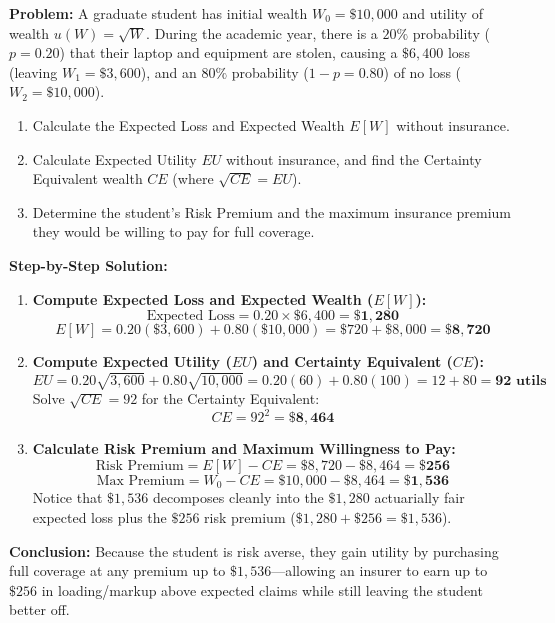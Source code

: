 \documentclass[11pt,letterpaper]{article}
\begin{document}
\begin{tcolorbox}[colback=CourseBlue!5!white,colframe=CourseBlue!80!black,title=\textbf{Work It Out: Expected Utility, Certainty Equivalent, and Maximum Premium}]
\textbf{Problem:} A graduate student has initial wealth $W_0 = \$10{,}000$ and utility of wealth $u(W) = \sqrt{W}$. During the academic year, there is a $20\%$ probability ($p = 0.20$) that their laptop and equipment are stolen, causing a $\$6{,}400$ loss (leaving $W_1 = \$3{,}600$), and an $80\%$ probability ($1 - p = 0.80$) of no loss ($W_2 = \$10{,}000$).
\begin{enumerate}
    \item Calculate the Expected Loss and Expected Wealth $E[W]$ without insurance.
    \item Calculate Expected Utility $EU$ without insurance, and find the Certainty Equivalent wealth $CE$ (where $\sqrt{CE} = EU$).
    \item Determine the student's Risk Premium and the maximum insurance premium they would be willing to pay for full coverage.
\end{enumerate}

\medskip
\noindent\textbf{Step-by-Step Solution:}
\begin{enumerate}
    \item \textbf{Compute Expected Loss and Expected Wealth ($E[W]$):}
    \[
    \text{Expected Loss} = 0.20 \times \$6{,}400 = \mathbf{\$1{,}280}
    \]
    \[
    E[W] = 0.20(\$3{,}600) + 0.80(\$10{,}000) = \$720 + \$8{,}000 = \mathbf{\$8{,}720}
    \]

    \item \textbf{Compute Expected Utility ($EU$) and Certainty Equivalent ($CE$):}
    \[
    EU = 0.20\sqrt{3{,}600} + 0.80\sqrt{10{,}000} = 0.20(60) + 0.80(100) = 12 + 80 = \mathbf{92\text{ utils}}
    \]
    Solve $\sqrt{CE} = 92$ for the Certainty Equivalent:
    \[
    CE = 92^2 = \mathbf{\$8{,}464}
    \]

    \item \textbf{Calculate Risk Premium and Maximum Willingness to Pay:}
    \[
    \text{Risk Premium} = E[W] - CE = \$8{,}720 - \$8{,}464 = \mathbf{\$256}
    \]
    \[
    \text{Max Premium} = W_0 - CE = \$10{,}000 - \$8{,}464 = \mathbf{\$1{,}536}
    \]
    Notice that $\$1{,}536$ decomposes cleanly into the $\$1{,}280$ actuarially fair expected loss plus the $\$256$ risk premium ($\$1{,}280 + \$256 = \$1{,}536$).
\end{enumerate}
\textbf{Conclusion:} Because the student is risk averse, they gain utility by purchasing full coverage at any premium up to $\$1{,}536$—allowing an insurer to earn up to $\$256$ in loading/markup above expected claims while still leaving the student better off.
\end{tcolorbox}
\end{document}
